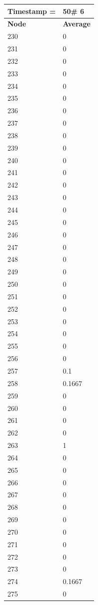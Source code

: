 \begin{tabular}{|l||l|}
\hline
\textbf{Timestamp =} & \textbf{50}\# 6\\\hline
	\textbf{Node} & \textbf{Average} \\ \hline
\hline
	230 & 0 \\ \hline
	231 & 0 \\ \hline
	232 & 0 \\ \hline
	233 & 0 \\ \hline
	234 & 0 \\ \hline
	235 & 0 \\ \hline
	236 & 0 \\ \hline
	237 & 0 \\ \hline
	238 & 0 \\ \hline
	239 & 0 \\ \hline
	240 & 0 \\ \hline
	241 & 0 \\ \hline
	242 & 0 \\ \hline
	243 & 0 \\ \hline
	244 & 0 \\ \hline
	245 & 0 \\ \hline
	246 & 0 \\ \hline
	247 & 0 \\ \hline
	248 & 0 \\ \hline
	249 & 0 \\ \hline
	250 & 0 \\ \hline
	251 & 0 \\ \hline
	252 & 0 \\ \hline
	253 & 0 \\ \hline
	254 & 0 \\ \hline
	255 & 0 \\ \hline
	256 & 0 \\ \hline
	257 & 0.1 \\ \hline
	258 & 0.1667 \\ \hline
	259 & 0 \\ \hline
	260 & 0 \\ \hline
	261 & 0 \\ \hline
	262 & 0 \\ \hline
	263 & 1 \\ \hline
	264 & 0 \\ \hline
	265 & 0 \\ \hline
	266 & 0 \\ \hline
	267 & 0 \\ \hline
	268 & 0 \\ \hline
	269 & 0 \\ \hline
	270 & 0 \\ \hline
	271 & 0 \\ \hline
	272 & 0 \\ \hline
	273 & 0 \\ \hline
	274 & 0.1667 \\ \hline
	275 & 0 \\ \hline
\end{tabular}


